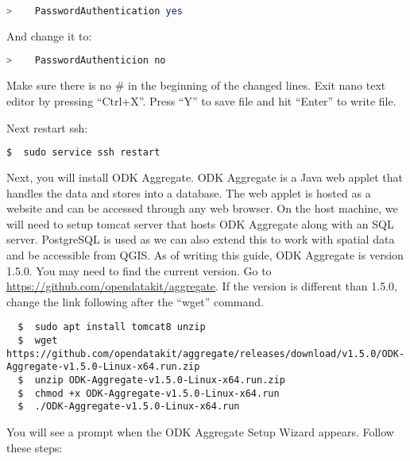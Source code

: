 \begin{lstlisting}[language=bash]
  >    PasswordAuthentication yes
\end{lstlisting}

\noindent
And change it to:

\begin{lstlisting}[language=bash]
  >    PasswordAuthenticion no
\end{lstlisting}

\noindent
Make sure there is no \# in the beginning of the changed lines. Exit nano text editor by pressing ``Ctrl+X''. Press ``Y'' to save file and hit ``Enter'' to write file.

\noindent
Next restart ssh:

\begin{lstlisting}[language=bash]
  $  sudo service ssh restart
\end{lstlisting}

\noindent
Next, you will install ODK Aggregate. ODK Aggregate is a Java web applet that handles the data and stores into a database. The web applet is hosted as a website and can be accessed through any web browser. On the host machine, we will need to setup tomcat server that hosts ODK Aggregate along with an SQL server. PostgreSQL is used as we can also extend this to work with spatial data and be accessible from QGIS. As of writing this guide, ODK Aggregate is version 1.5.0. You may need to find the current version. Go to \url{https://github.com/opendatakit/aggregate}. If the version is different than 1.5.0, change the link following after the ``wget'' command.

\begin{lstlisting}
  $  sudo apt install tomcat8 unzip
  $  wget https://github.com/opendatakit/aggregate/releases/download/v1.5.0/ODK-Aggregate-v1.5.0-Linux-x64.run.zip
  $  unzip ODK-Aggregate-v1.5.0-Linux-x64.run.zip
  $  chmod +x ODK-Aggregate-v1.5.0-Linux-x64.run
  $  ./ODK-Aggregate-v1.5.0-Linux-x64.run
\end{lstlisting}

\noindent
You will see a prompt when the ODK Aggregate Setup Wizard appears. Follow these steps:

